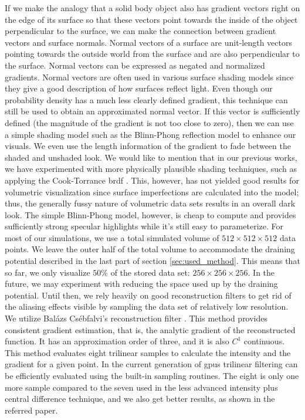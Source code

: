 If we make the analogy that a solid body object also has gradient vectors right on the edge of its surface so that these vectors point towards the inside of the object perpendicular to the surface,
we can make the connection between gradient vectors and surface normals.
Normal vectors of a surface are unit-length vectors pointing towards the outside world from the surface and are also perpendicular to the surface.
Normal vectors can be expressed as negated and normalized gradients.
Normal vectors are often used in various surface shading models since they give a good description of how surfaces reflect light.
Even though our probability density has a much less clearly defined gradient, this technique can still be used to obtain an approximated normal vector.
If this vector is sufficiently defined (the magnitude of the gradient is not too close to zero), then we can use a simple shading model such as the Blinn-Phong reflection model \cite{Blinn1977} to enhance our visuals.
We even use the length information of the gradient to fade between the shaded and unshaded look.
We would like to mention that in our previous works, we have experimented with more physically plausible shading techniques, such as applying the Cook-Torrance \acrfull{brdf} \cite{CookTorrance1982}.
This, however, has not yielded good results for volumetric visualization since surface imperfections are calculated into the model; thus, the generally fussy nature of volumetric data sets results in an overall dark look.
The simple Blinn-Phong model, however, is cheap to compute and provides sufficiently strong specular highlights while it's still easy to parameterize.
For most of our simulations, we use a total simulated volume of $512\times 512 \times 512$ data points.
We leave the outer half of the total volume to accommodate the draining potential described in the last part of section \ref{sec:used_method}.
This means that so far, we only visualize $50\%$ of the stored data set: $256 \times 256 \times 256$.
In the future, we may experiment with reducing the space used up by the draining potential.
Until then, we rely heavily on good reconstruction filters to get rid of the aliasing effects visible by sampling the data set of relatively low resolution.
We utilize Balázs Csébfalvi's reconstruction filter \cite{csebfalvi2023}.
This method provides consistent gradient estimation, that is, the analytic gradient of the reconstructed function.
It has an approximation order of three, and it is also $C^1$ continuous.
This method evaluates eight trilinear samples to calculate the intensity and the gradient for a given point.
In the current generation of \acrshort{gpu}s trilinear filtering can be efficiently evaluated using the built-in sampling routines.
The eight is only one more sample compared to the seven used in the less advanced intensity plus central difference technique, and we also get better results, as shown in the referred paper.

